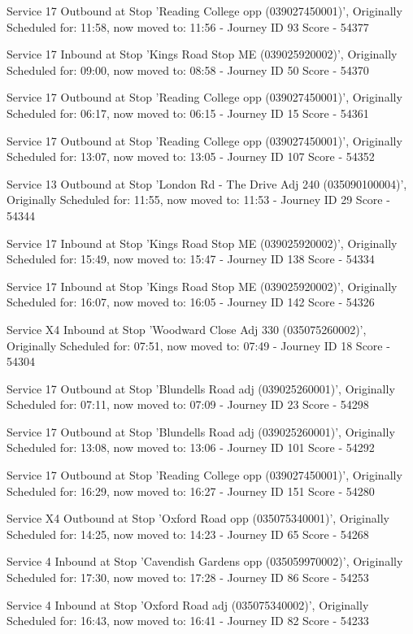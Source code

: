 \documentclass{article}
\begin{document}
Service 17 Outbound at Stop 'Reading College opp (039027450001)', Originally Scheduled for: 11:58, now moved to: 11:56 - Journey ID 93      Score - 54377

Service 17 Inbound at Stop 'Kings Road Stop ME (039025920002)', Originally Scheduled for: 09:00, now moved to: 08:58 - Journey ID 50      Score - 54370

Service 17 Outbound at Stop 'Reading College opp (039027450001)', Originally Scheduled for: 06:17, now moved to: 06:15 - Journey ID 15      Score - 54361

Service 17 Outbound at Stop 'Reading College opp (039027450001)', Originally Scheduled for: 13:07, now moved to: 13:05 - Journey ID 107      Score - 54352

Service 13 Outbound at Stop 'London Rd - The Drive Adj 240 (035090100004)', Originally Scheduled for: 11:55, now moved to: 11:53 - Journey ID 29      Score - 54344

Service 17 Inbound at Stop 'Kings Road Stop ME (039025920002)', Originally Scheduled for: 15:49, now moved to: 15:47 - Journey ID 138      Score - 54334

Service 17 Inbound at Stop 'Kings Road Stop ME (039025920002)', Originally Scheduled for: 16:07, now moved to: 16:05 - Journey ID 142      Score - 54326

Service X4 Inbound at Stop 'Woodward Close Adj 330 (035075260002)', Originally Scheduled for: 07:51, now moved to: 07:49 - Journey ID 18      Score - 54304

Service 17 Outbound at Stop 'Blundells Road adj (039025260001)', Originally Scheduled for: 07:11, now moved to: 07:09 - Journey ID 23      Score - 54298

Service 17 Outbound at Stop 'Blundells Road adj (039025260001)', Originally Scheduled for: 13:08, now moved to: 13:06 - Journey ID 101      Score - 54292

Service 17 Outbound at Stop 'Reading College opp (039027450001)', Originally Scheduled for: 16:29, now moved to: 16:27 - Journey ID 151      Score - 54280

Service X4 Outbound at Stop 'Oxford Road opp (035075340001)', Originally Scheduled for: 14:25, now moved to: 14:23 - Journey ID 65      Score - 54268

Service 4 Inbound at Stop 'Cavendish Gardens opp (035059970002)', Originally Scheduled for: 17:30, now moved to: 17:28 - Journey ID 86      Score - 54253

Service 4 Inbound at Stop 'Oxford Road adj (035075340002)', Originally Scheduled for: 16:43, now moved to: 16:41 - Journey ID 82      Score - 54233
\end{document}
